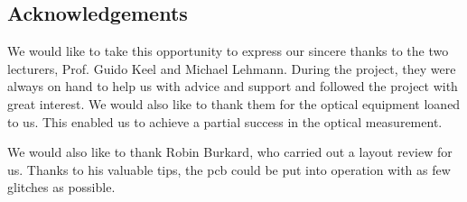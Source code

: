 \subsection{Acknowledgements}

We would like to take this opportunity to express our sincere thanks to the two lecturers, Prof. Guido Keel and Michael
Lehmann. During the project, they were always on hand to help us with advice and support and followed the project with
great interest. We would also like to thank them for the optical equipment loaned to us. This enabled us to achieve a
partial success in the optical measurement.

We would also like to thank Robin Burkard, who carried out a layout review for us. Thanks to his valuable tips, the
\acrshort{pcb} could be put into operation with as few glitches as possible.
